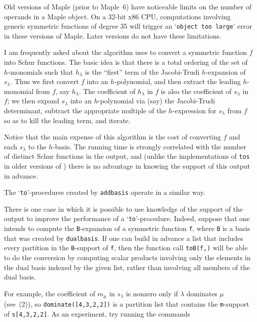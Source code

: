 Old versions of Maple (prior to Maple~6) have
noticeable limits on the number of operands in a Maple object.
On a 32-bit x86 CPU, computations involving generic symmetric functions
of degree 35 will trigger an `{\tt object too large}' error in these
versions of Maple. Later versions do not have these limitations.

I am frequently asked about the algorithm \SF{}
uses to convert a symmetric function $f$ into Schur functions.
The basic idea is that there is a total ordering of the set of
$h$-monomials such that $h_\lambda$ is the ``first'' term of the
Jacobi-Trudi $h$-expansion of $s_\lambda$. Thus we first convert $f$
into an $h$-polynomial, and then extract the leading $h$-monomial from $f$,
say $h_\lambda$. The coefficient of $h_\lambda$ in $f$ is also the
coefficient of $s_\lambda$ in $f$; we then expand $s_\lambda$ into
an $h$-polynomial via (say) the Jacobi-Trudi determinant, subtract
the appropriate multiple of the $h$-expression for $s_\lambda$ from $f$
so as to kill the leading term, and iterate.

Notice that the main expense of this algorithm is the cost of
converting $f$ and each $s_\lambda$ to the $h$-basis. The running time
is strongly correlated with the number of distinct Schur functions in
the output, and (unlike the implementations of {\tt tos} in older
versions of \SF) there is no advantage in knowing the support of this
output in advance.

The `{\tt to}'-procedures created by {\tt add\ul{}basis} operate in
a similar way.

There is one case in which it is possible to use knowledge of the support
of the output to improve the performance of a `{\tt to}'-procedure.
Indeed, suppose that one intends to compute the {\tt B}-expansion of a
symmetric function {\tt f}, where {\tt B} is a basis that was created
by {\tt dual\ul{}basis}. If one can build in advance a list that
includes every partition in the {\tt B}-support of {\tt f}, then the
function call {\tt toB(f,)} will be able to do
the conversion by computing scalar products involving only the elements
in the dual basis indexed by the given list, rather than involving all
members of the dual basis.

For example, the coefficient of $m_\mu$ in $s_\lambda$ is nonzero
only if $\lambda$ dominates $\mu$ (see~(2)), so {\tt dominate([4,3,2,2])}
is a partition list that contains the {\tt m}-support of {\tt s[4,3,2,2]}.
As an experiment, try running the commands


